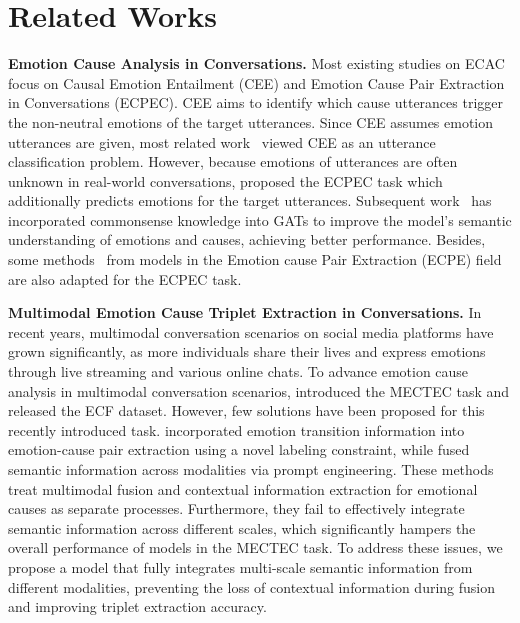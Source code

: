 \documentclass[11pt]{article}
\begin{document}
\section{Related Works}
\textbf{Emotion Cause Analysis in Conversations.}
Most existing studies on ECAC focus on Causal Emotion Entailment (CEE) and Emotion Cause Pair Extraction in Conversations (ECPEC).
CEE aims to identify which cause utterances trigger the non-neutral emotions of the target utterances.
Since CEE assumes emotion utterances are given, most related work~\cite{RECCON, li2022neutral, zhang2022tsam, gu2023page} viewed CEE as an utterance classification problem.
However, because emotions of utterances are often unknown in real-world conversations, \citet{li2022ecpec} proposed the ECPEC task which additionally predicts emotions for the target utterances.
Subsequent work~\cite{wang2023generative, zhao2023knowledge} has incorporated commonsense knowledge into GATs to improve the model's semantic understanding of emotions and causes, achieving better performance.
Besides, some methods~\cite{ECPE-2D, ECPE-MLL, wei2020effective, UECA-Prompt} from models in the Emotion cause Pair Extraction (ECPE) field are also adapted for the ECPEC task.

\noindent \textbf{Multimodal Emotion Cause Triplet Extraction in Conversations.} In recent years, multimodal conversation scenarios on social media platforms have grown significantly, as more individuals share their lives and express emotions through live streaming and various online chats.
To advance emotion cause analysis in multimodal conversation scenarios, \citet{ecf} introduced the MECTEC task and released the ECF dataset.
However, few solutions have been proposed for this recently introduced task.
\citet{li2024multimodal} incorporated emotion transition information into emotion-cause pair extraction using a novel labeling constraint, while \citet{UniMEEC} fused semantic information across modalities via prompt engineering.
These methods treat multimodal fusion and contextual information extraction for emotional causes as separate processes.
Furthermore, they fail to effectively integrate semantic information across different scales, which significantly hampers the overall performance of models in the MECTEC task.
To address these issues, we propose a model that fully integrates multi-scale semantic information from different modalities, preventing the loss of contextual information during fusion and improving triplet extraction accuracy.
\end{document}
